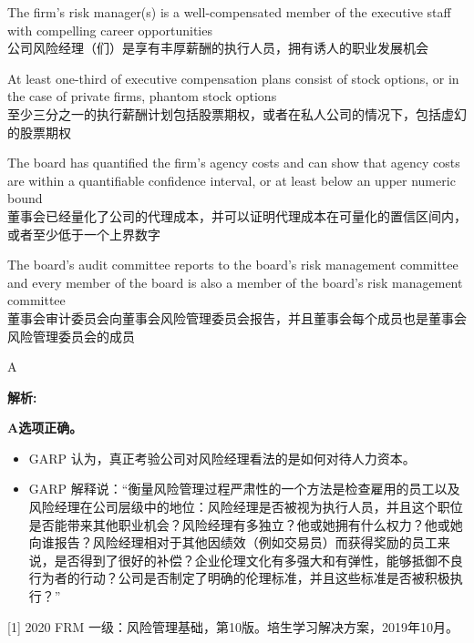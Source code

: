 \documentclass{article}
\newenvironment{explanation}
{\textbf{解析:}\par}
{\par}
\begin{document}
\begin{choices}
    \item The firm's risk manager(s) is a well-compensated member of the executive staff with compelling career opportunities
    \\公司风险经理（们）是享有丰厚薪酬的执行人员，拥有诱人的职业发展机会
    \item At least one-third of executive compensation plans consist of stock options, or in the case of private firms, phantom stock options
    \\至少三分之一的执行薪酬计划包括股票期权，或者在私人公司的情况下，包括虚幻的股票期权
    \item The board has quantified the firm's agency costs and can show that agency costs are within a quantifiable confidence interval, or at least below an upper numeric bound
    \\董事会已经量化了公司的代理成本，并可以证明代理成本在可量化的置信区间内，或者至少低于一个上界数字
    \item The board's audit committee reports to the board's risk management committee and every member of the board is also a member of the board's risk management committee
    \\董事会审计委员会向董事会风险管理委员会报告，并且董事会每个成员也是董事会风险管理委员会的成员
\end{choices}

\begin{correctanswer}
    A
\end{correctanswer}

\begin{explanation}
    \textbf{A选项正确。}
    \begin{itemize}
        \item GARP 认为，真正考验公司对风险经理看法的是如何对待人力资本。
        \item GARP 解释说：“衡量风险管理过程严肃性的一个方法是检查雇用的员工以及风险经理在公司层级中的地位：风险经理是否被视为执行人员，并且这个职位是否能带来其他职业机会？风险经理有多独立？他或她拥有什么权力？他或她向谁报告？风险经理相对于其他因绩效（例如交易员）而获得奖励的员工来说，是否得到了很好的补偿？企业伦理文化有多强大和有弹性，能够抵御不良行为者的行动？公司是否制定了明确的伦理标准，并且这些标准是否被积极执行？”
    \end{itemize}
    
    [1] 2020 FRM 一级：风险管理基础，第10版。培生学习解决方案，2019年10月。
\end{explanation}
\end{document}
